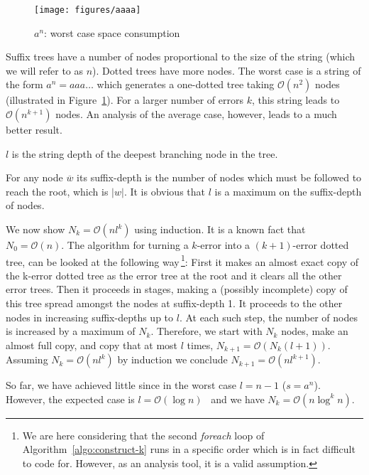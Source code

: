 \begin{figure}
\centering
\texttt{[image: figures/aaaa]}
\caption{$a^n$: worst case space consumption}%
\label{fig:aaaa}
\end{figure}

Suffix trees have a number of nodes proportional to the size of the string (which we will refer to as $n$). Dotted trees have more nodes. The worst case is a string of the form $a^n = aaa\dots$ which generates a one-dotted tree taking $\mathcal{O}(n^2)$ nodes (illustrated in Figure~\ref{fig:aaaa}). For a larger number of errors $k$, this string leads to $\mathcal{O}(n^{k+1})$ nodes. An analysis of the average case, however, leads to a much better result. 

\begin{definition}
$l$ is the string depth of the deepest branching node in the tree.
%

For any node $\overline{w}$ its suffix-depth is the number of nodes which must be followed to reach the root, which is $|w|$. It is obvious that $l$ is a maximum on the suffix-depth of nodes.
\end{definition}

We now show $N_k = \mathcal{O}(nl^k)$ using induction. It is a known fact that $N_0 = \mathcal{O}(n)$. The algorithm for turning a $k$-error into a $(k+1)$-error dotted tree, can be looked at the following way\,\footnote{We are here considering that the second \textit{foreach} loop of Algorithm~\ref{algo:construct-k} runs in a specific order which is in fact difficult to code for. However, as an analysis tool, it is a valid assumption.}: First it makes an almost exact copy of the k-error dotted tree as the error tree at the root and it clears all the other error trees. Then it proceeds in stages, making a (possibly incomplete) copy of this tree spread amongst the nodes at suffix-depth 1. It proceeds to the other nodes in increasing suffix-depths up to $l$. At each such step, the number of nodes is increased by a maximum of $N_k$. Therefore, we start with $N_k$ nodes, make an almost full copy, and copy that at most $l$ times, $N_{k+1}=\mathcal{O}(N_k(l+1))$. Assuming $N_k=\mathcal{O}(nl^k)$ by induction we conclude $N_{k+1}=\mathcal{O}(nl^{k+1})$.

So far, we have achieved little since in the worst case $l=n-1$ ($s=a^n$). However, the expected case is $l=\mathcal{O}(\log n)$~\cite{apostolico92selfalignments,szpankowski:unexpected} and we have $N_k=\mathcal{O}(n\log^k n)$.
